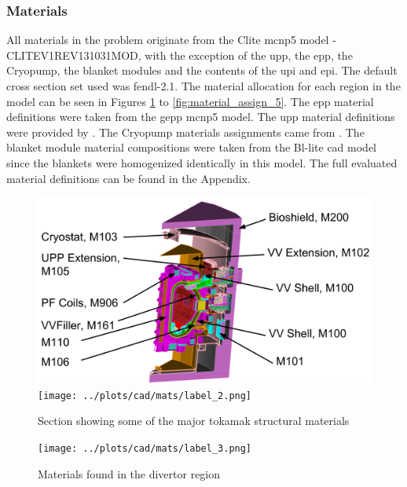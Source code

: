 \documentclass[12pt]{article}
\begin{document}
\subsubsection{Materials}
All materials in the problem originate from the Clite \gls{mcnp5} model -
CLITE\textunderscore V1\textunderscore REV131031\textunderscore MOD, with the
exception of the \gls{upp}, the \gls{epp}, the
Cryopump, the blanket modules and the contents of the \gls{upi} and \gls{epi}.
The default cross section set used was \gls{fendl}-2.1. The material allocation
for each region in the model can be seen in Figures \ref{fig:material_assign_1} 
to \ref{fig:material_assign_5}. The \gls{epp} material 
definitions were taken from the \gls{gepp} \gls{mcnp5} model\cite{epp_materials}.
The \gls{upp} material definitions were provided by 
\cite{bertalot_communication}. The Cryopump materials assignments
came from \cite{cryopump_communication}. The blanket module material
compositions were taken from the Bl-lite \gls{cad} model since the blankets were
homogenized identically in this model. The full evaluated material definitions
can be found in the Appendix.
\begin{figure}[p]
  \centering
  \includegraphics[scale=0.32]{../plots/cad/mats/label_1.png}
  \texttt{[image: ../plots/cad/mats/label\_2.png]}
  \caption{Section showing some of the major tokamak structural materials}
  \label{fig:material_assign_1}
\end{figure}

\begin{figure}[p]
  \centering
  \texttt{[image: ../plots/cad/mats/label\_3.png]}
  \caption{Materials found in the divertor region}
  \label{fig:material_assign_2}
\end{figure}
\end{document}
